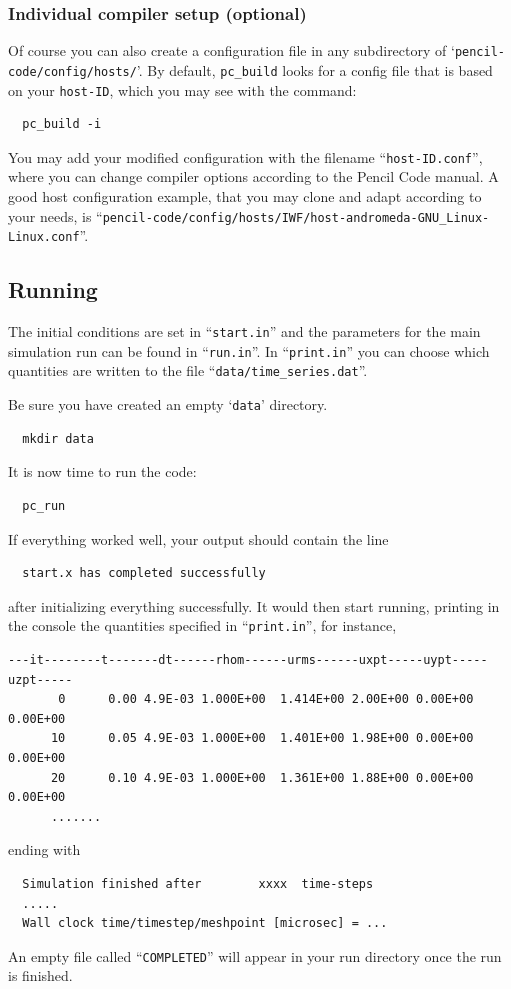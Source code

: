 \documentclass[a4paper,12pt]{article}
\newcommand{\command}[1]{\texttt{#1}}
\newcommand{\file}[1]{``\texttt{#1}''}
\newcommand{\directory}[1]{`\texttt{#1}'}
\newcommand{\code}[1]{\texttt{#1}}
\begin{document}
\subsubsection{Individual compiler setup (optional)}

Of course you can also create a configuration file in any subdirectory of \directory{pencil-code/config/hosts/}.
By default, \command{pc\_build} looks for a config file that is based on your \code{host-ID}, which you may see with the command:
\begin{verbatim}
  pc_build -i
\end{verbatim}
You may add your modified configuration with the filename \file{host-ID.conf}, where you can change compiler options according to the Pencil Code manual.
A good host configuration example, that you may clone and adapt according to your needs, is \file{pencil-code/config/hosts/IWF/host-andromeda-GNU\_Linux-Linux.conf}.

\subsection{Running}

The initial conditions are set in \file{start.in} and the parameters for the main simulation run can be found in \file{run.in}.
In \file{print.in} you can choose which quantities are written to the file \file{data/time\_series.dat}.

Be sure you have created an empty \directory{data} directory.
\begin{verbatim}
  mkdir data
\end{verbatim}

It is now time to run the code:
\begin{verbatim}
  pc_run
\end{verbatim}
If everything worked well, your output should contain the line
\begin{verbatim}
  start.x has completed successfully
\end{verbatim}
after initializing everything successfully. It would then start running,   
printing in the console the quantities specified in \file{print.in}, for 
instance,
\begin{verbatim}
---it--------t-------dt------rhom------urms------uxpt-----uypt-----uzpt-----
       0      0.00 4.9E-03 1.000E+00  1.414E+00 2.00E+00 0.00E+00 0.00E+00
      10      0.05 4.9E-03 1.000E+00  1.401E+00 1.98E+00 0.00E+00 0.00E+00
      20      0.10 4.9E-03 1.000E+00  1.361E+00 1.88E+00 0.00E+00 0.00E+00 
      .......
\end{verbatim}
ending with
\begin{verbatim}
  Simulation finished after        xxxx  time-steps
  .....
  Wall clock time/timestep/meshpoint [microsec] = ...
\end{verbatim}
An empty file called \file{COMPLETED} will appear in your run directory once 
the run is finished.
\end{document}
